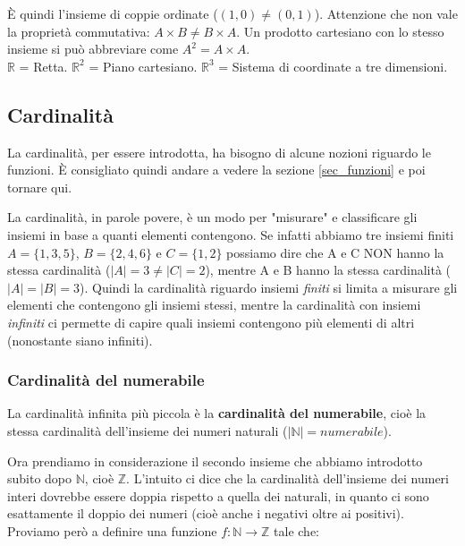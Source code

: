 È quindi l'insieme di coppie ordinate ($(1, 0) \neq (0, 1)$). Attenzione che non vale la proprietà commutativa: $A\times B \neq B\times A$. Un prodotto cartesiano con lo stesso insieme si può abbreviare come $A^2 = A\times A$.\\ 

$\mathbb{R}$ = Retta. $\mathbb{R}^2$ = Piano cartesiano. $\mathbb{R}^3$ = Sistema di coordinate a tre dimensioni. %

\subsection{Cardinalità}
La cardinalità, per essere introdotta, ha bisogno di alcune nozioni riguardo le funzioni. È consigliato quindi andare a vedere la sezione \ref{sec_funzioni} e poi tornare qui.\\



La cardinalità, in parole povere, è un modo per "misurare" e classificare gli insiemi in base a quanti elementi contengono. Se infatti abbiamo tre insiemi finiti $A=\{1, 3, 5\}$, $B=\{2, 4, 6\}$ e $C=\{1, 2\}$ possiamo dire che A e C NON hanno la stessa cardinalità ($|A|=3 \neq |C| = 2$), mentre A e B hanno la stessa cardinalità ($|A| = |B| = 3$). Quindi la cardinalità riguardo insiemi \textit{finiti} si limita a misurare gli elementi che contengono gli insiemi stessi, mentre la cardinalità con insiemi \textit{infiniti} ci permette di capire quali insiemi contengono più elementi di altri (nonostante siano infiniti).\\

\subsubsection{Cardinalità del numerabile}

La cardinalità infinita più piccola è la \textbf{cardinalità del numerabile}, cioè la stessa cardinalità dell'insieme dei numeri naturali ($|\mathbb{N}| = numerabile$).

Ora prendiamo in considerazione il secondo insieme che abbiamo introdotto subito dopo $\mathbb{N}$, cioè $\mathbb{Z}.$ L'intuito ci dice che la cardinalità dell'insieme dei numeri interi dovrebbe essere doppia rispetto a quella dei naturali, in quanto ci sono esattamente il doppio dei numeri (cioè anche i negativi oltre ai positivi). Proviamo però a definire una funzione $f: \mathbb{N} \to \mathbb{Z}$ tale che:

